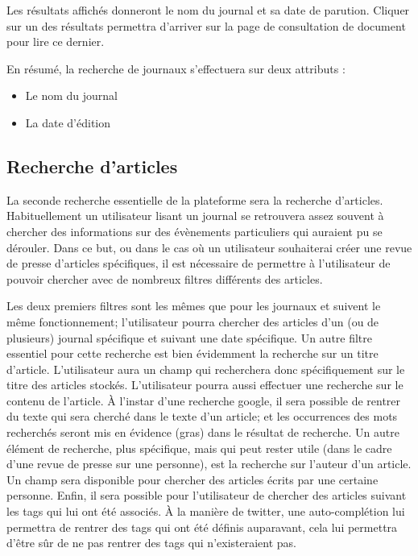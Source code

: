 Les résultats affichés donneront le nom du journal et sa date de parution. Cliquer sur un des résultats permettra d'arriver sur la page de consultation de document pour lire ce dernier.

En résumé, la recherche de journaux s'effectuera sur deux attributs :
\begin{itemize}
	\item Le nom du journal
	\item La date d'édition
\end{itemize}

\subsection{Recherche d'articles}
\label{sec:recherche_article}

La seconde recherche essentielle de la plateforme sera la recherche d'articles. Habituellement un utilisateur lisant un journal se retrouvera assez souvent à chercher des informations sur des évènements particuliers qui auraient pu se dérouler. Dans ce but, ou dans le cas où un utilisateur souhaiterai créer une revue de presse d'articles spécifiques, il est nécessaire de permettre à l'utilisateur de pouvoir chercher avec de nombreux filtres différents des articles.

Les deux premiers filtres sont les mêmes que pour les journaux et suivent le même fonctionnement; l'utilisateur pourra chercher des articles d'un (ou de plusieurs) journal spécifique et suivant une date spécifique. Un autre filtre essentiel pour cette recherche est bien évidemment la recherche sur un titre d'article. L'utilisateur aura un champ qui recherchera donc spécifiquement sur le titre des articles stockés. L'utilisateur pourra aussi effectuer une recherche sur le contenu de l'article. À l'instar d'une recherche google, il sera possible de rentrer du texte qui sera cherché dans le texte d'un article; et les occurrences des mots recherchés seront mis en évidence (gras) dans le résultat de recherche. Un autre élément de recherche, plus spécifique, mais qui peut rester utile (dans le cadre d'une revue de presse sur une personne), est la recherche sur l'auteur d'un article. Un champ sera disponible pour chercher des articles écrits par une certaine personne. Enfin, il sera possible pour l'utilisateur de chercher des articles suivant les tags qui lui ont été associés. À la manière de twitter, une auto-complétion lui permettra de rentrer des tags qui ont été définis auparavant, cela lui permettra d'être sûr de ne pas rentrer des tags qui n'existeraient pas.

